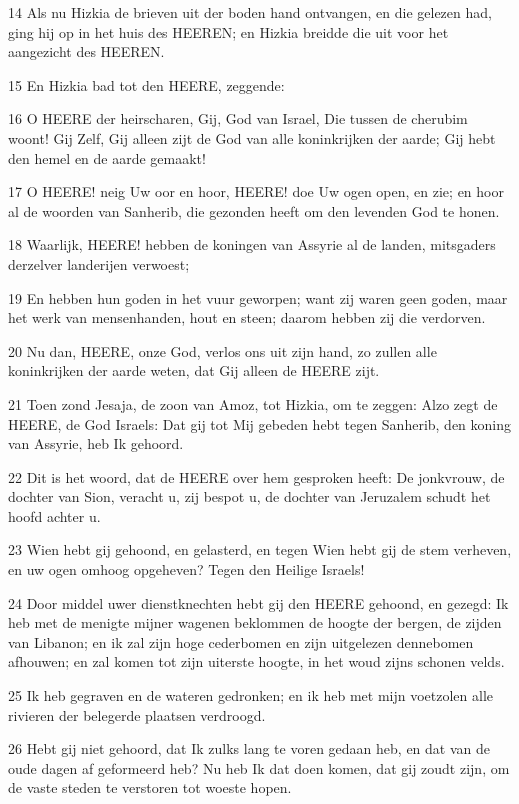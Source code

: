 \par 14 Als nu Hizkia de brieven uit der boden hand ontvangen, en die gelezen had, ging hij op in het huis des HEEREN; en Hizkia breidde die uit voor het aangezicht des HEEREN.
\par 15 En Hizkia bad tot den HEERE, zeggende:
\par 16 O HEERE der heirscharen, Gij, God van Israel, Die tussen de cherubim woont! Gij Zelf, Gij alleen zijt de God van alle koninkrijken der aarde; Gij hebt den hemel en de aarde gemaakt!
\par 17 O HEERE! neig Uw oor en hoor, HEERE! doe Uw ogen open, en zie; en hoor al de woorden van Sanherib, die gezonden heeft om den levenden God te honen.
\par 18 Waarlijk, HEERE! hebben de koningen van Assyrie al de landen, mitsgaders derzelver landerijen verwoest;
\par 19 En hebben hun goden in het vuur geworpen; want zij waren geen goden, maar het werk van mensenhanden, hout en steen; daarom hebben zij die verdorven.
\par 20 Nu dan, HEERE, onze God, verlos ons uit zijn hand, zo zullen alle koninkrijken der aarde weten, dat Gij alleen de HEERE zijt.
\par 21 Toen zond Jesaja, de zoon van Amoz, tot Hizkia, om te zeggen: Alzo zegt de HEERE, de God Israels: Dat gij tot Mij gebeden hebt tegen Sanherib, den koning van Assyrie, heb Ik gehoord.
\par 22 Dit is het woord, dat de HEERE over hem gesproken heeft: De jonkvrouw, de dochter van Sion, veracht u, zij bespot u, de dochter van Jeruzalem schudt het hoofd achter u.
\par 23 Wien hebt gij gehoond, en gelasterd, en tegen Wien hebt gij de stem verheven, en uw ogen omhoog opgeheven? Tegen den Heilige Israels!
\par 24 Door middel uwer dienstknechten hebt gij den HEERE gehoond, en gezegd: Ik heb met de menigte mijner wagenen beklommen de hoogte der bergen, de zijden van Libanon; en ik zal zijn hoge cederbomen en zijn uitgelezen dennebomen afhouwen; en zal komen tot zijn uiterste hoogte, in het woud zijns schonen velds.
\par 25 Ik heb gegraven en de wateren gedronken; en ik heb met mijn voetzolen alle rivieren der belegerde plaatsen verdroogd.
\par 26 Hebt gij niet gehoord, dat Ik zulks lang te voren gedaan heb, en dat van de oude dagen af geformeerd heb? Nu heb Ik dat doen komen, dat gij zoudt zijn, om de vaste steden te verstoren tot woeste hopen.
